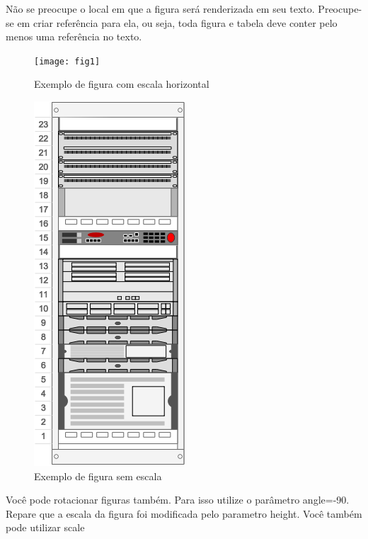 \documentclass[	DIV=calc,%
							paper=a4,%
							fontsize=12pt,%
							onecolumn]{scrartcl}	 					%
\begin{document}
Não se preocupe o local em que a figura será renderizada em seu texto. Preocupe-se em criar referência para ela, ou seja, toda figura e tabela deve conter pelo menos uma referência no texto.

\begin{figure}
\centering
\texttt{[image: fig1]}
\caption{Exemplo de figura com escala horizontal}
\label{fig1}
\end{figure}


\begin{figure}
	\centering
	\includegraphics[]{fig2}
	\caption{Exemplo de figura sem escala}
	\label{fig2}
\end{figure}

Você pode rotacionar figuras também. Para isso utilize o parâmetro angle=-90. Repare que a escala da figura foi modificada pelo parametro height. Você também pode utilizar scale
\end{document}
